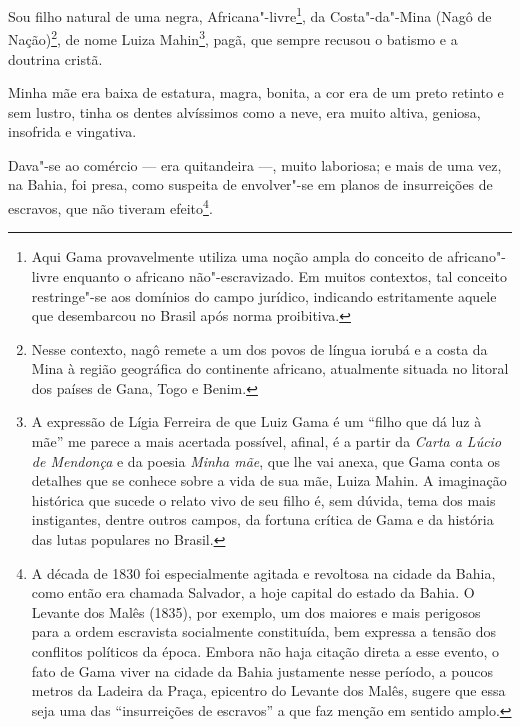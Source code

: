 Sou filho natural de uma negra, Africana"-livre\footnote{Aqui Gama
  provavelmente utiliza uma noção ampla do conceito de africano"-livre
  enquanto o africano não"-escravizado. Em muitos contextos, tal conceito
  restringe"-se aos domínios do campo jurídico, indicando estritamente
  aquele que desembarcou no Brasil após norma proibitiva.}, da
Costa"-da"-Mina (Nagô de Nação)\footnote{Nesse contexto, nagô remete a
  um dos povos de língua iorubá e a costa da Mina à região geográfica do
  continente africano, atualmente situada no litoral dos países de Gana,
  Togo e Benim.}, de nome Luiza Mahin\footnote{A expressão de Lígia
  Ferreira de que Luiz Gama é um ``filho que dá luz à mãe'' me parece a
  mais acertada possível, afinal, é a partir da \emph{Carta a Lúcio de
  Mendonça} e da poesia \emph{Minha mãe}, que lhe vai anexa, que Gama
  conta os detalhes que se conhece sobre a vida de sua mãe, Luiza Mahin.
  A imaginação histórica que sucede o relato vivo de seu filho é, sem
  dúvida, tema dos mais instigantes, dentre outros campos, da fortuna
  crítica de Gama e da história das lutas populares no Brasil.}, pagã,
que sempre recusou o batismo e a doutrina cristã.

Minha mãe era baixa de estatura, magra, bonita, a cor era de um preto
retinto e sem lustro, tinha os dentes alvíssimos como a neve, era muito
altiva, geniosa, insofrida e vingativa.

Dava"-se ao comércio --- era quitandeira ---, muito laboriosa; e mais de
uma vez, na Bahia, foi presa, como suspeita de envolver"-se em planos de
insurreições de escravos, que não tiveram efeito\footnote{A década de
  1830 foi especialmente agitada e revoltosa na cidade da Bahia, como
  então era chamada Salvador, a hoje capital do estado da Bahia. O
  Levante dos Malês (1835), por exemplo, um dos maiores e mais perigosos
  para a ordem escravista socialmente constituída, bem expressa a tensão
  dos conflitos políticos da época. Embora não haja citação direta a
  esse evento, o fato de Gama viver na cidade da Bahia justamente nesse
  período, a poucos metros da Ladeira da Praça, epicentro do Levante dos
  Malês, sugere que essa seja uma das ``insurreições de escravos'' a que
  faz menção em sentido amplo.}.

